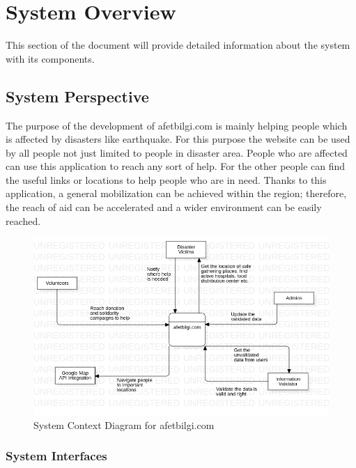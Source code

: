 \section{System Overview}

This section of the document will provide detailed information about the system with its components. 

\subsection{System Perspective}

The purpose of the development of afetbilgi.com is mainly helping people which is affected by disasters like earthquake.
For this purpose the website can be used by all people not just limited to people in disaster area. 
People who are affected can use this application to reach any sort of help.
For the other people can find the useful links or locations to help people who are in need. 
Thanks to this application, a general mobilization can be achieved within the region; therefore, the reach of aid can be accelerated and a wider environment can be easily reached.

\begin{figure}[H]
    \begin{center}
        \includegraphics[scale = 0.60]{assets/SystemContextDiagram.png}
        \caption[System Context Diagram]{System Context Diagram for afetbilgi.com}
    \end{center}
\end{figure}

\subsubsection{System Interfaces}

